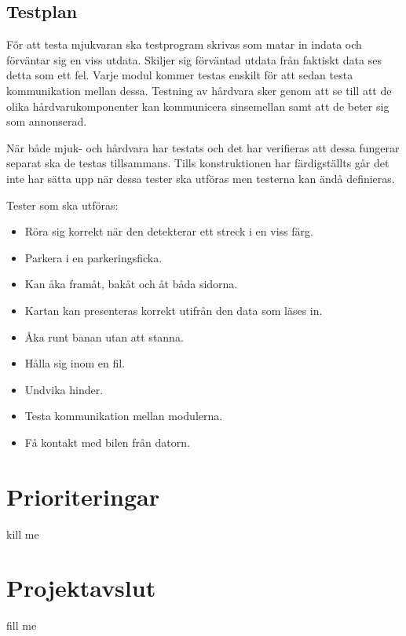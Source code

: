 \documentclass[projektplan/plan.tex]{subfiles}
\begin{document}
\subsection{Testplan}
För att testa mjukvaran ska testprogram skrivas som matar in indata och
förväntar sig en viss utdata. Skiljer sig förväntad utdata från faktiskt data
ses detta som ett fel. Varje modul kommer testas enskilt för att sedan testa
kommunikation mellan dessa. Testning av hårdvara sker genom att se till att de
olika hårdvarukomponenter kan kommunicera sinsemellan samt att de beter sig som
annonserad.

När både mjuk- och hårdvara har testats och det har verifieras att dessa
fungerar separat ska de testas tillsammans. Tills konstruktionen har
färdigställts går det inte har sätta upp när dessa tester ska utföras men
testerna kan ändå definieras.

\vspace{5mm}
\noindent
Tester som ska utföras:
\begin{itemize}
    \item Röra sig korrekt när den detekterar ett streck i en viss färg.
    \item Parkera i en parkeringsficka.
    \item Kan åka framåt, bakåt och åt båda sidorna.
    \item Kartan kan presenteras korrekt utifrån den data som läses in.
    \item Åka runt banan utan att stanna.
    \item Hålla sig inom en fil.
    \item Undvika hinder.
    \item Testa kommunikation mellan modulerna.
    \item Få kontakt med bilen från datorn.
\end{itemize}


\section{Prioriteringar}
kill me

\section{Projektavslut}
fill me
\end{document}
